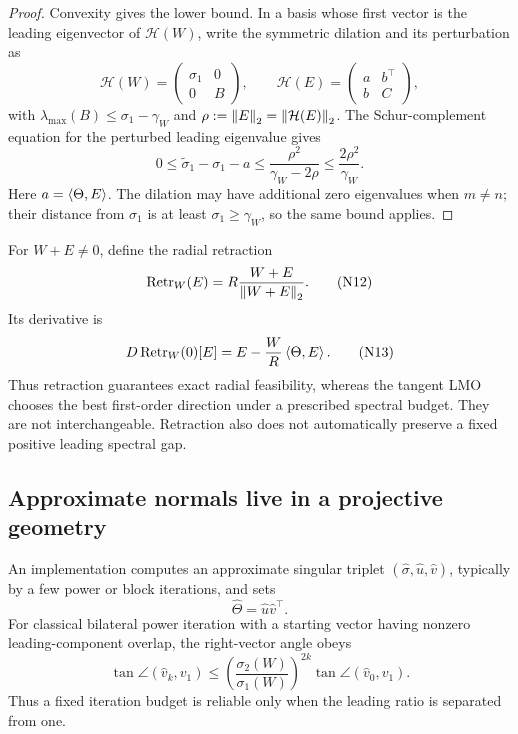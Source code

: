 \begin{proof}
Convexity gives the lower bound.  In a basis whose first vector is the leading
eigenvector of \(\mathcal H(W)\), write the symmetric dilation and its
perturbation as
\[
 \mathcal H(W)=\begin{pmatrix}\sigma_1&0\\0&B\end{pmatrix},
 \qquad
 \mathcal H(E)=\begin{pmatrix}a&b^\top\\b&C\end{pmatrix},
\]
with \(\lambda_{\max}(B)\le\sigma_1-\gamma_W\) and
\(\rho:=\left\lVert E\right\rVert_{2}=\left\lVert \mathcal H(E)\right\rVert_{2}\).  The Schur-complement equation for
the perturbed leading eigenvalue gives
\[
 0\le\widetilde\sigma_1-\sigma_1-a
 \le \frac{\rho^2}{\gamma_W-2\rho}
 \le \frac{2\rho^2}{\gamma_W}.
\]
Here \(a=\left\langle \Theta,E\right\rangle\).  The dilation may have additional zero eigenvalues
when \(m\ne n\); their distance from \(\sigma_1\) is at least
\(\sigma_1\ge\gamma_W\), so the same bound applies.
\end{proof}

For \(W+E\ne0\), define the radial retraction
\begin{equation}
 \operatorname{Retr}_W(E)=R\frac{W+E}{\left\lVert W+E\right\rVert_{2}}.
\tag{N12}
\label{eq:radial-retraction}
\end{equation}
Its derivative is
\begin{equation}
 D\operatorname{Retr}_W(0)[E]
 =
 E-\frac WR\left\langle \Theta,E\right\rangle.
\tag{N13}
\label{eq:retraction-derivative}
\end{equation}
Thus retraction guarantees exact radial feasibility, whereas the tangent LMO
chooses the best first-order direction under a prescribed spectral budget.
They are not interchangeable.  Retraction also does not automatically
preserve a fixed positive leading spectral gap.

\subsection{Approximate normals live in a projective geometry}

An implementation computes an approximate singular triplet
\((\hat\sigma,\hat u,\hat v)\), typically by a few power or block iterations,
and sets
\begin{equation}
 \hat\Theta=\hat u\hat v^\top.
\tag{N14}
\end{equation}
For classical bilateral power iteration with a starting vector having nonzero
leading-component overlap, the right-vector angle obeys
\begin{equation}
 \tan\angle(\hat v_k,v_1)
 \le
 \left(\frac{\sigma_2(W)}{\sigma_1(W)}\right)^{2k}
 \tan\angle(\hat v_0,v_1).
\tag{N14a}
\label{eq:power-rate}
\end{equation}
Thus a fixed iteration budget is reliable only when the leading ratio is
separated from one.

